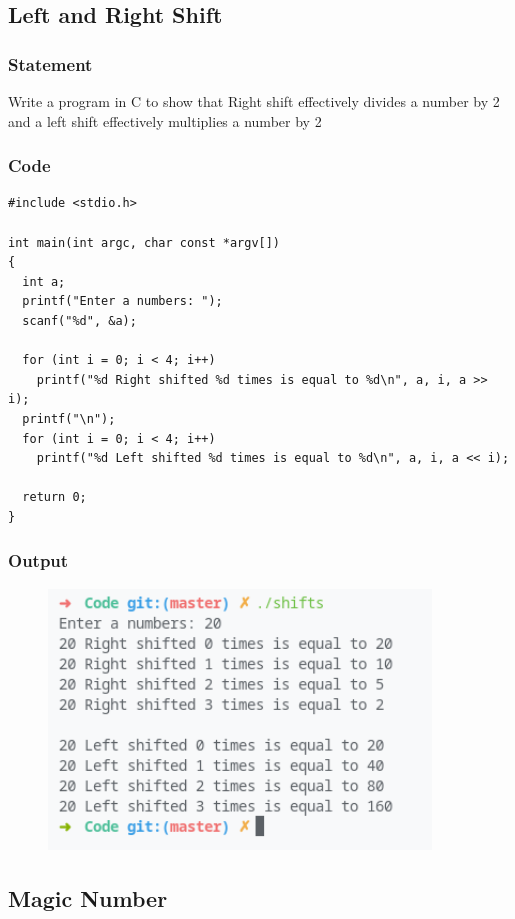 \pagebreak
\subsection{Left and Right Shift}

\subsubsection{Statement}
Write a program in C to show that Right shift effectively divides a number by 2 and a left shift
effectively multiplies a number by 2

\subsubsection{Code}
\begin{verbatim} 
#include <stdio.h>

int main(int argc, char const *argv[])
{
  int a;
  printf("Enter a numbers: ");
  scanf("%d", &a);

  for (int i = 0; i < 4; i++)
    printf("%d Right shifted %d times is equal to %d\n", a, i, a >> i);
  printf("\n");
  for (int i = 0; i < 4; i++)
    printf("%d Left shifted %d times is equal to %d\n", a, i, a << i);

  return 0;
}

\end{verbatim}
\subsubsection{Output}
\begin{figure}[!htb]
  \centering
  \includegraphics[width=4in]{Images/shifts.png}
  \label{output:7}
\end{figure}


\pagebreak
\subsection{Magic Number}


